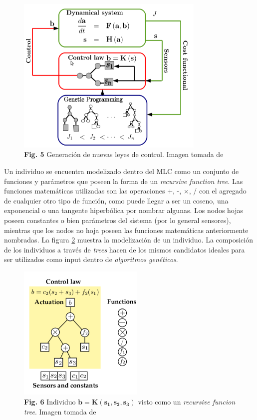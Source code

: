 \documentclass[a4paper,10pt]{article}
\begin{document}
        \begin{figure}[!Hhtb]
            \centering
            \includegraphics[width=9cm,origin=c]{Imagenes/MLC_block_diagram.png}
            \caption{\textbf{Fig. 5} Generación de nuevas leyes de control. Imagen tomada de \cite{Duriez2016}} \label{fig005}
        \end{figure}

        Un individuo se encuentra modelizado dentro del MLC como un conjunto de funciones y parámetros que poseen la forma de un
        \textit{recursive function tree}. Las funciones matemáticas utilizadas son las operaciones +, -, $\times$, / con el agregado
        de cualquier otro tipo de función, como puede llegar a ser un coseno, una exponencial o una tangente hiperbólica por nombrar
        algunas. Los nodos hojas poseen constantes o bien parámetros del sistema (por lo general sensores), mientras que los nodos no hoja
        poseen las funciones matemáticas anteriormente nombradas. La figura \ref{fig006} muestra la modelización de un individuo.
        La composición de los individuos a través de \textit{trees} hacen de los mismos candidatos ideales para ser utilizados como input
        dentro de \textit{algoritmos genéticos}.

        \begin{figure}[!Hhtb]
            \centering
            \includegraphics[width=6cm,origin=c]{Imagenes/individual_tree.png}
            \caption{\textbf{Fig. 6} Individuo $\mathbf{b = K(s_1, s_2, s_3)}$ visto como un \textit{recursive funcion tree}. Imagen
            tomada de \cite{Duriez2016}} \label{fig006}
        \end{figure}
\end{document}
